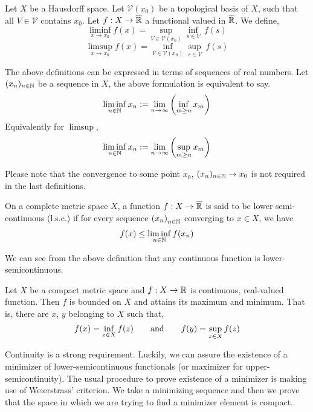 \begin{definition}
	Let $X$ be a Hausdorff space. Let $\mathcal{V}(x_0)$ be a topological basis of $X$, such that all $V\in \mathcal{V}$ contains $x_0$. Let $f: X\rightarrow \overline{\mathbb{R}}$ a functional valued in $\overline{\mathbb{R}}$. We define, 
	\begin{equation*}
	\liminf_{x\rightarrow x_0} f(x)= \sup_{V\in \mathcal{V}(x_0)} \inf_{s\in V}\ f(s)
	\end{equation*}
	\begin{equation*}
	\limsup_{x\rightarrow x_0} f(x)= \inf_{V\in \mathcal{V}(x_0)} \sup_{s\in V}\ f(s)
	\end{equation*}
	
	The above definitions can be expressed in terms of sequences of real numbers. Let $(x_n)_{n \in \mathbb{N}}$ be a sequence in $X$, the above formulation is equivalent to say.
	\begin{equation*}
	\liminf_{n\in \mathbb{N}} x_n := \lim_{n\rightarrow \infty} \left( \inf_{m\geq n} x_m \right)
	\end{equation*}
	Equivalently for $\limsup$,
	\begin{equation*}
	\liminf_{n\in \mathbb{N}} x_n := \lim_{n\rightarrow \infty} \left( \sup_{m\geq n} x_m \right)
	\end{equation*}
	
	Please note that the convergence to some point $x_0$, $(x_n)_{n\in \mathbb{N}}\rightarrow x_0$ is not required in the last definitions.
\end{definition}

\begin{definition}
	On a complete metric space $X$, a function $f: X\rightarrow\overline{\mathbb{R}}$ is said to be lower semi-continuous (l.s.c.) if for every sequence $\left( x_n \right)_{n\in\mathbb{N}}$ converging to $x\in X$, we have 
	\begin{equation*}
	f(x)\leq \liminf_{n\in \mathbb{N}} f(x_n)
	\end{equation*}
\end{definition}

We can see from the above definition that any continuous function is lower-semicontinuous. 

\begin{theorem}
	Let $X$ be a compact metric space and $f: X\rightarrow \mathbb{R}$ is continuous, real-valued function. Then $f$ is bounded on $X$ and attains its maximum and minimum. That is, there are $x$, $y$ belonging to $X$ such that,
	\begin{equation*}
	f(x)=\inf_{z\in X}f(z) \qquad \mathrm{and} \qquad f(y)=\sup_{z \in X} f(z)
	\end{equation*}
\end{theorem}
Continuity is a strong requirement. Luckily, we can assure the existence of a minimizer of lower-semicontinuous functionals (or maximizer for upper-semicontinuity). The usual procedure to prove existence of a minimizer is making use of Weierstrass' criterion. We take a minimizing sequence and then we prove that the space in which we are trying to find a minimizer element is compact.


